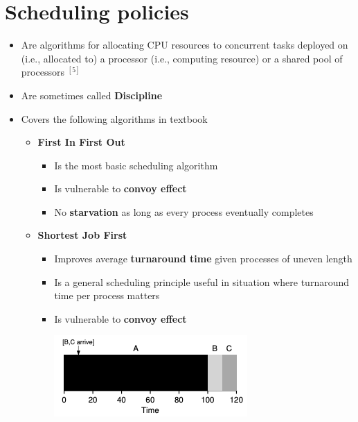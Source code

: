 \documentclass[12pt]{article}
\begin{document}
\section{Scheduling policies}

\begin{itemize}
    \item Are algorithms for allocating CPU resources to concurrent tasks
    deployed on (i.e., allocated to) a processor (i.e., computing resource)
    or a shared pool of processors $^{[5]}$
    \item Are sometimes called \textbf{Discipline}
    \item Covers the following algorithms in textbook

    \begin{itemize}
        \item \textbf{First In First Out}

        \begin{itemize}
            \item Is the most basic scheduling algorithm
            \item Is vulnerable to \textbf{convoy effect}
            \item No \textbf{starvation} as long as every process eventually completes
        \end{itemize}

        \item \textbf{Shortest Job First}

        \begin{itemize}
            \item Improves average \textbf{turnaround time} given processes of uneven length
            \item Is a general scheduling principle useful in situation where turnaround time
            per process matters
            \item Is vulnerable to \textbf{convoy effect}

            \begin{center}
            \includegraphics[width=0.7\linewidth]{images/midterm_2_solution_6.png}
            \end{center}


\end{itemize}
\end{itemize}
\end{itemize}
\end{document}
